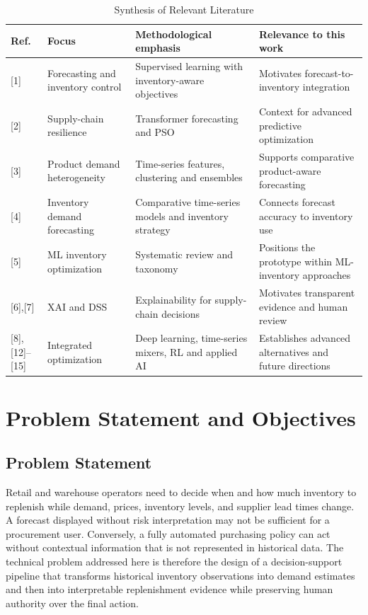 \documentclass[9pt,conference]{IEEEtran}
\providecommand{\syscite}[1]{}
\begin{document}
\begin{table}[htbp]
\centering
\caption{Synthesis of Relevant Literature}
\scriptsize
\setlength{\tabcolsep}{2pt}
\begin{tabular}{@{}p{0.65cm}p{1.65cm}p{2.35cm}p{2.65cm}@{}}
\toprule
\textbf{Ref.} & \textbf{Focus} & \textbf{Methodological emphasis} & \textbf{Relevance to this work} \\
\midrule
{[1]} & Forecasting and inventory control & Supervised learning with inventory-aware objectives & Motivates forecast-to-inventory integration \\
{[2]} & Supply-chain resilience & Transformer forecasting and PSO & Context for advanced predictive optimization \\
{[3]} & Product demand heterogeneity & Time-series features, clustering and ensembles & Supports comparative product-aware forecasting \\
{[4]} & Inventory demand forecasting & Comparative time-series models and inventory strategy & Connects forecast accuracy to inventory use \\
{[5]} & ML inventory optimization & Systematic review and taxonomy & Positions the prototype within ML-inventory approaches \\
{[6],[7]} & XAI and DSS & Explainability for supply-chain decisions & Motivates transparent evidence and human review \\
{[8],[12]--[15]} & Integrated optimization & Deep learning, time-series mixers, RL and applied AI & Establishes advanced alternatives and future directions \\
\bottomrule
\end{tabular}
\label{tab:literature}
\end{table}

\section{Problem Statement and Objectives}
\subsection{Problem Statement}
Retail and warehouse operators need to decide when and how much inventory to replenish while demand, prices, inventory levels, and supplier lead times change. \syscite{[cite: 1]} A forecast displayed without risk interpretation may not be sufficient for a procurement user. \syscite{[cite: 1]} Conversely, a fully automated purchasing policy can act without contextual information that is not represented in historical data. \syscite{[cite: 1]} The technical problem addressed here is therefore the design of a decision-support pipeline that transforms historical inventory observations into demand estimates and then into interpretable replenishment evidence while preserving human authority over the final action. \syscite{[cite: 1]}
\end{document}
